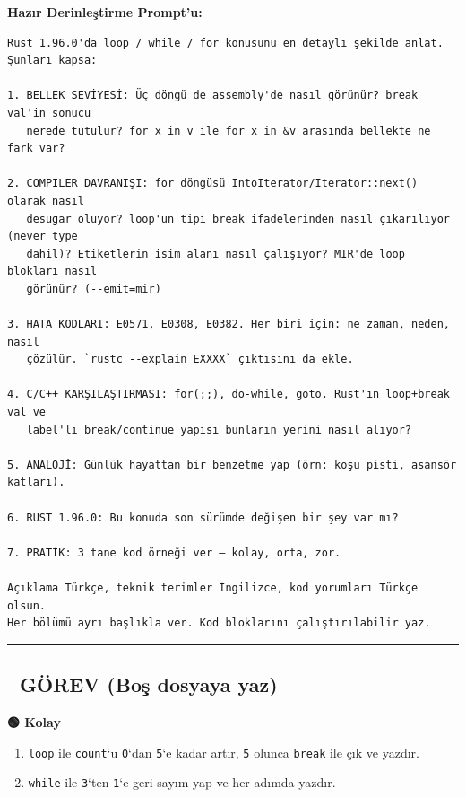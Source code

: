 \documentclass[12pt,a4paper]{article}
\begin{document}
\textbf{Hazır Derinleştirme Prompt'u:}

\begin{verbatim}
Rust 1.96.0'da loop / while / for konusunu en detaylı şekilde anlat. Şunları kapsa:

1. BELLEK SEVİYESİ: Üç döngü de assembly'de nasıl görünür? break val'in sonucu
   nerede tutulur? for x in v ile for x in &v arasında bellekte ne fark var?

2. COMPILER DAVRANIŞI: for döngüsü IntoIterator/Iterator::next() olarak nasıl
   desugar oluyor? loop'un tipi break ifadelerinden nasıl çıkarılıyor (never type
   dahil)? Etiketlerin isim alanı nasıl çalışıyor? MIR'de loop blokları nasıl
   görünür? (--emit=mir)

3. HATA KODLARI: E0571, E0308, E0382. Her biri için: ne zaman, neden, nasıl
   çözülür. `rustc --explain EXXXX` çıktısını da ekle.

4. C/C++ KARŞILAŞTIRMASI: for(;;), do-while, goto. Rust'ın loop+break val ve
   label'lı break/continue yapısı bunların yerini nasıl alıyor?

5. ANALOJİ: Günlük hayattan bir benzetme yap (örn: koşu pisti, asansör katları).

6. RUST 1.96.0: Bu konuda son sürümde değişen bir şey var mı?

7. PRATİK: 3 tane kod örneği ver — kolay, orta, zor.

Açıklama Türkçe, teknik terimler İngilizce, kod yorumları Türkçe olsun.
Her bölümü ayrı başlıkla ver. Kod bloklarını çalıştırılabilir yaz.
\end{verbatim}

\begin{center}\rule{0.5\linewidth}{0.5pt}\end{center}

\subsection{📝 GÖREV (Boş dosyaya yaz)}\label{görev-boş-dosyaya-yaz-7}

\textbf{🟢 Kolay}

\begin{enumerate}
\def\labelenumi{\arabic{enumi}.}
\tightlist
\item
  \texttt{loop} ile \texttt{count}`u \texttt{0}`dan \texttt{5}`e kadar artır, \texttt{5} olunca \texttt{break} ile çık ve yazdır.
\item
  \texttt{while} ile \texttt{3}`ten \texttt{1}`e geri sayım yap ve her adımda yazdır.
\end{enumerate}
\end{document}
